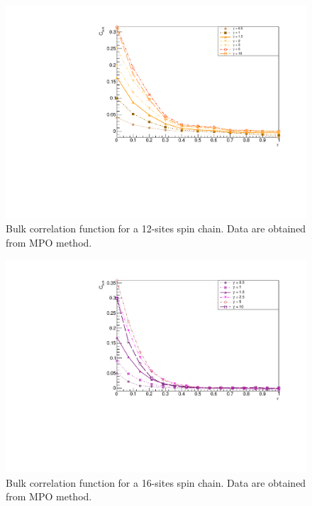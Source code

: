 \begin{figure}[H]
    \centering
    \includegraphics[scale=0.7]{Figures/12sites/12sites_CFBulkCONNVSgamma.pdf}
    \captionsetup{width=1.\linewidth}
    \caption{Bulk correlation function for a 12-sites spin chain. Data are obtained from MPO method.}
    \label{fig:12sites_CFBulkCONNVSgamma}
\end{figure}

\begin{figure}[H]
    \centering
    \includegraphics[scale=0.7]{Figures/16sites/16sites_CFBulkCONNVSgamma.pdf}
    \captionsetup{width=1.\linewidth}
    \caption{Bulk correlation function for a 16-sites spin chain. Data are obtained from MPO method.}
    \label{fig:16sites_CFBulkCONNVSgamma}
\end{figure}

